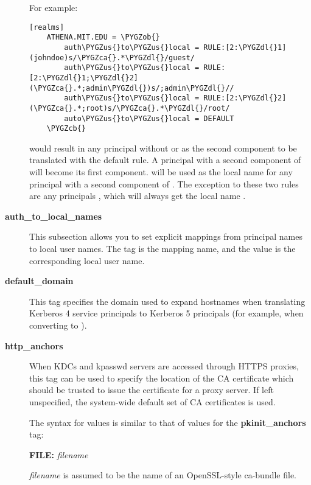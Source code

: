 \documentclass[letterpaper,10pt,english]{sphinxmanual}
\def\PYGZus{\char`\_}
\def\PYGZob{\char`\{}
\def\PYGZcb{\char`\}}
\def\PYGZca{\char`\^}
\def\PYGZdl{\char`\$}
\begin{document}
\begin{description}
\begin{description}
\end{description}

For example:

\begin{Verbatim}[commandchars=\\\{\}]
[realms]
    ATHENA.MIT.EDU = \PYGZob{}
        auth\PYGZus{}to\PYGZus{}local = RULE:[2:\PYGZdl{}1](johndoe)s/\PYGZca{}.*\PYGZdl{}/guest/
        auth\PYGZus{}to\PYGZus{}local = RULE:[2:\PYGZdl{}1;\PYGZdl{}2](\PYGZca{}.*;admin\PYGZdl{})s/;admin\PYGZdl{}//
        auth\PYGZus{}to\PYGZus{}local = RULE:[2:\PYGZdl{}2](\PYGZca{}.*;root)s/\PYGZca{}.*\PYGZdl{}/root/
        auto\PYGZus{}to\PYGZus{}local = DEFAULT
    \PYGZcb{}
\end{Verbatim}

would result in any principal without  or  as the
second component to be translated with the default rule.  A
principal with a second component of  will become its
first component.   will be used as the local name for any
principal with a second component of .  The exception to
these two rules are any principals , which will
always get the local name .

\item[{\textbf{auth\_to\_local\_names}}] \leavevmode
This subsection allows you to set explicit mappings from principal
names to local user names.  The tag is the mapping name, and the
value is the corresponding local user name.

\item[{\textbf{default\_domain}}] \leavevmode
This tag specifies the domain used to expand hostnames when
translating Kerberos 4 service principals to Kerberos 5 principals
(for example, when converting  to
).

\item[{\textbf{http\_anchors}}] \leavevmode
When KDCs and kpasswd servers are accessed through HTTPS proxies, this tag
can be used to specify the location of the CA certificate which should be
trusted to issue the certificate for a proxy server.  If left unspecified,
the system-wide default set of CA certificates is used.

The syntax for values is similar to that of values for the
\textbf{pkinit\_anchors} tag:

\textbf{FILE:} \emph{filename}

\emph{filename} is assumed to be the name of an OpenSSL-style ca-bundle file.


\end{description}
\end{document}
